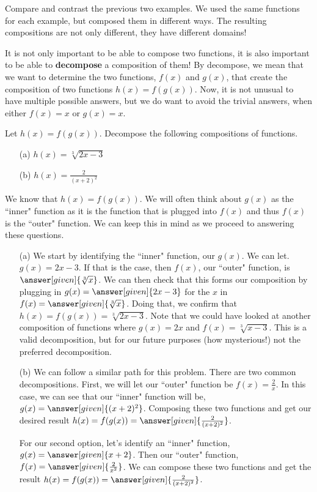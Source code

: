 \documentclass{ximera}
\begin{document}
Compare and contrast the previous two examples.  We used the same
functions for each example, but composed them in different ways.  The resulting
compositions are not only different, they have different domains!



It is not only important to be able to compose two functions, it is also important to be able to \textbf{decompose} a composition of them! By decompose, we mean that we want to determine the two functions, $f(x)$ and $g(x)$, that create the composition of two functions $h(x)=f(g(x))$. Now, it is not unusual to have multiple possible answers, but we do want to avoid the trivial answers, when either $f(x)=x$ or $g(x)=x$.

\begin{example}
   Let $h(x)=f(g(x))$. Decompose the following compositions of functions.
    \begin{enumerate}
        \item[(a)] $h(x)=\sqrt[3]{2x-3}$ 
        \item[(b)] $h(x)=\frac{2}{(x+2)^2}$
    \end{enumerate}
    \begin{explanation}
    We know that $h(x)=f(g(x))$. We will often think about $g(x)$ as the ``inner" function as it is the function that is plugged into $f(x)$ and thus $f(x)$ is the ``outer" function. We can keep this in mind as we proceed to answering these questions.
        \begin{enumerate}
            \item[(a)] We start by identifying the ``inner" function, our $g(x)$. We can let. $g(x)=2x-3$. If that is the case, then $f(x)$, our ``outer" function, is $\answer[given]{\sqrt[3]{x}}$. We can then check that this forms our composition by plugging in $g(x)=\answer[given]{2x-3}$ for the $x$ in $f(x)=\answer[given]{\sqrt[3]{x}}$. Doing that, we confirm that $h(x)=f(g(x))=\sqrt[3]{2x-3}$. Note that we could have looked at another composition of functions where $g(x)=2x$ and $f(x)=\sqrt[3]{x-3}$. This is a valid decomposition, but for our future purposes (how mysterious!) not the preferred decomposition.
            
            \item[(b)] We can follow a similar path for this problem. There are two common decompositions. First, we will let our ``outer" function be $f(x)=\frac{2}{x}$.  In this case, we can see that our ``inner" function will be, $g(x)=\answer[given]{(x+2)^2}$. Composing these two functions and get our desired result $h(x)=f(g(x))=\answer[given]{\frac{2}{(x+2)^2}}$.
            
            For our second option, let's identify an ``inner" function, $g(x)=\answer[given]{x+2}$. Then our ``outer" function, $f(x)=\answer[given]{\frac{2}{x^2}}$. We can compose these two functions and get the result $h(x)=f(g(x))=\answer[given]{\frac{2}{(x+2)^2}}$.
           
        \end{enumerate}
    \end{explanation}
\end{example}
\end{document}

